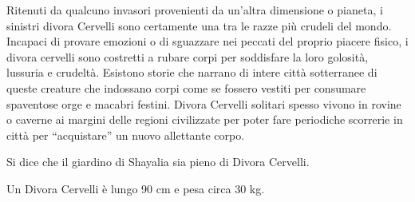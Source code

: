 \begin{multicols}{2}
Ritenuti da qualcuno invasori provenienti da un’altra dimensione o pianeta, i sinistri divora Cervelli sono certamente una tra le razze più crudeli del mondo. Incapaci di provare emozioni o di sguazzare nei peccati del proprio piacere fisico, i divora cervelli sono costretti a rubare corpi per soddisfare la loro golosità, lussuria e crudeltà. Esistono storie che narrano di intere città sotterranee di queste creature che indossano corpi come se fossero vestiti per consumare spaventose orge e macabri festini. Divora Cervelli solitari spesso vivono in rovine o caverne ai margini delle regioni civilizzate per poter fare periodiche scorrerie in città per “acquistare” un nuovo allettante corpo.

Si dice che il giardino di Shayalia sia pieno di Divora Cervelli.

Un Divora Cervelli è lungo 90 cm e pesa circa 30 kg.


\end{multicols}
